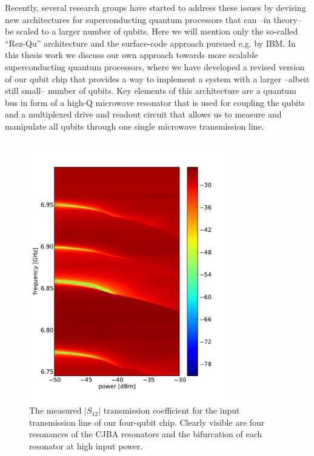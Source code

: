 Recently, several research groups have started to address these issues by devising new architectures for superconducting quantum processors that can --in theory-- be scaled to a larger number of qubits. Here we will mention only the so-called ``Rez-Qu'' architecture \citep{galiautdinov_resonatorzero-qubit_2012} and the surface-code approach \citep{divincenzo_fault-tolerant_2009} pursued e.g. by IBM. In this thesis work we discuss our own approach towards more scalable superconducting quantum processors, where we have developed a revised version of our qubit chip that provides a way to implement a system with a larger --albeit still small-- number of qubits. Key elements of this architecture are a quantum bus in form of a high-Q microwave resonator that is used for coupling the qubits and a multiplexed drive and readout circuit that allows us to measure and manipulate all qubits through one single microwave transmission line. 

\begin{figure}
	\centering
	\includegraphics[width=8.8cm]{"./data/scalable architecture/jba spectroscopy/spectro"}
	\caption[Measured $|S_{12}|$ transmission coefficient for the input transmission line of our four-qubit chip]{The measured $|S_{12}|$ transmission coefficient for the input transmission line of our four-qubit chip. Clearly visible are four resonances of the CJBA resonators and the bifurcation of each resonator at high input power.}
	\label{fig:jba_multiplexed_spectroscopy}
\end{figure}

